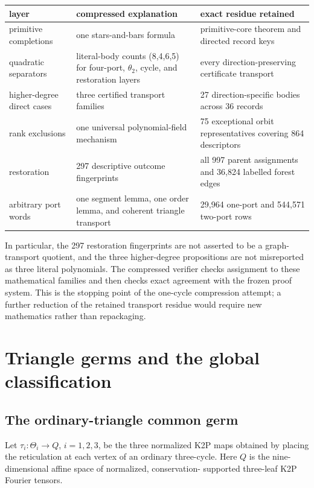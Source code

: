 \documentclass[11pt]{article}
\theoremstyle{remark}
\newcommand{\1}{\mathbf 1}
\begin{document}
\begin{center}
\small
\begin{tabular}{L{.25\linewidth}L{.27\linewidth}L{.38\linewidth}}
\toprule
layer & compressed explanation & exact residue retained \\
\midrule
primitive completions & one stars-and-bars formula & primitive-core theorem
and directed record keys \\
quadratic separators & literal-body counts (8,4,6,5) for four-port,
\(\theta_2\), cycle, and restoration layers & every direction-preserving
certificate transport \\
higher-degree direct cases & three certified transport families & 27
direction-specific bodies across 36 records \\
rank exclusions & one universal polynomial-field mechanism & 75 exceptional
orbit representatives covering 864 descriptors \\
restoration & 297 descriptive outcome fingerprints & all 997 parent
assignments and 36,824 labelled forest edges \\
arbitrary port words & one segment lemma, one order lemma, and coherent
triangle transport & 29,964 one-port and 544,571 two-port rows \\
\bottomrule
\end{tabular}
\end{center}

In particular, the 297 restoration fingerprints are not asserted to be a
graph-transport quotient, and the three higher-degree propositions are not
misreported as three literal polynomials.  The compressed verifier checks
assignment to these mathematical families and then checks exact agreement
with the frozen proof system.  This is the stopping point of the one-cycle
compression attempt; a further reduction of the retained transport residue
would require new mathematics rather than repackaging.

\section{Triangle germs and the global classification}\label{sec:global}

\subsection{The ordinary-triangle common germ}

Let \(\tau_i:\Theta_i\to Q\), \(i=1,2,3\), be the three normalized K2P maps
obtained by placing the reticulation at each vertex of an ordinary three-cycle.
Here \(Q\) is the nine-dimensional affine space of normalized, conservation-
supported three-leaf K2P Fourier tensors.
\end{document}
